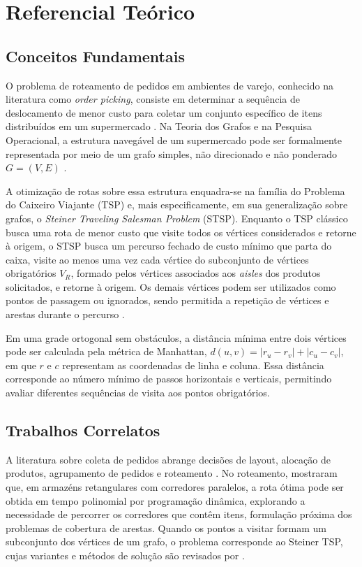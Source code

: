 \section{Referencial Teórico}
\label{referencial}

\subsection{Conceitos Fundamentais}
\label{ssec:conceitos}

O problema de roteamento de pedidos em ambientes de varejo, conhecido na literatura como \textit{order picking}, consiste em determinar a sequência de deslocamento de menor custo para coletar um conjunto específico de itens distribuídos em um supermercado \citep{dekoster2007}. Na Teoria dos Grafos e na Pesquisa Operacional, a estrutura navegável de um supermercado pode ser formalmente representada por meio de um grafo simples, não direcionado e não ponderado $G = (V, E)$ \citep{bondy2008}.

A otimização de rotas sobre essa estrutura enquadra-se na família do Problema do Caixeiro Viajante (TSP) e, mais especificamente, em sua generalização sobre grafos, o \textit{Steiner Traveling Salesman Problem} (STSP). Enquanto o TSP clássico busca uma rota de menor custo que visite todos os vértices considerados e retorne à origem, o STSP busca um percurso fechado de custo mínimo que parta do caixa, visite ao menos uma vez cada vértice do subconjunto de vértices obrigatórios $V_R$, formado pelos vértices associados aos \textit{aisles} dos produtos solicitados, e retorne à origem. Os demais vértices podem ser utilizados como pontos de passagem ou ignorados, sendo permitida a repetição de vértices e arestas durante o percurso \citep{rodriguezpereira2019}.

Em uma grade ortogonal sem obstáculos, a distância mínima entre dois vértices pode ser calculada pela métrica de Manhattan, $d(u,v) = |r_u - r_v| + |c_u - c_v|$, em que $r$ e $c$ representam as coordenadas de linha e coluna. Essa distância corresponde ao número mínimo de passos horizontais e verticais, permitindo avaliar diferentes sequências de visita aos pontos obrigatórios.

\subsection{Trabalhos Correlatos}
\label{ssec:correlatos}

A literatura sobre coleta de pedidos abrange decisões de layout, alocação de produtos, agrupamento de pedidos e roteamento \citep{dekoster2007}. No roteamento, \citet{ratliff1983} mostraram que, em armazéns retangulares com corredores paralelos, a rota ótima pode ser obtida em tempo polinomial por programação dinâmica, explorando a necessidade de percorrer os corredores que contêm itens, formulação próxima dos problemas de cobertura de arestas. Quando os pontos a visitar formam um subconjunto dos vértices de um grafo, o problema corresponde ao Steiner TSP, cujas variantes e métodos de solução são revisados por \citet{rodriguezpereira2019}.

